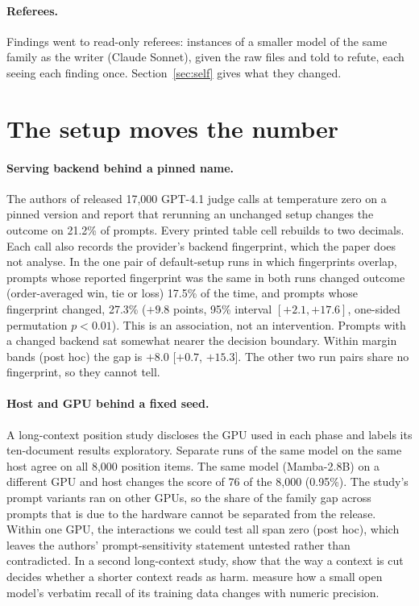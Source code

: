 \documentclass[11pt]{article}
\begin{document}
\paragraph{Referees.} Findings went to read-only referees: instances of a smaller model of the same family as the writer (Claude Sonnet),
given the raw files and told to refute, each seeing each finding once. Section~\ref{sec:self} gives what they changed.

\section{The setup moves the number}
\paragraph{Serving backend behind a pinned name.} The authors of \citep{r2610_30512} released 17,000 GPT-4.1 judge calls at temperature zero
on a pinned version and report that rerunning an unchanged setup changes the outcome on 21.2\% of prompts. Every printed table cell rebuilds to
two decimals. Each call also records the provider's backend fingerprint, which the paper does not analyse. In the one pair of default-setup
runs in which fingerprints overlap, prompts whose reported fingerprint was the same in both runs changed outcome (order-averaged win, tie or
loss) 17.5\% of the time, and prompts whose fingerprint changed, 27.3\% ($+9.8$ points, 95\% interval $[+2.1,+17.6]$, one-sided permutation
$p<0.01$). This is an association, not an intervention. Prompts with a changed backend sat somewhat nearer the decision boundary. Within margin
bands (post hoc) the gap is $+8.0$ [$+0.7$, $+15.3$]. The other two run pairs share no fingerprint, so they cannot tell.
\paragraph{Host and GPU behind a fixed seed.} A long-context position study \citep{r2610_31135} discloses the GPU used in each phase and labels
its ten-document results exploratory. Separate runs of the same model on the same host agree on all 8,000 position items. The same model (Mamba-2.8B)
on a different GPU and host changes the score of 76 of the 8,000 (0.95\%). The study's prompt variants
ran on other GPUs, so the share of the family gap across prompts that is due to the hardware cannot be separated from the release. Within one
GPU, the interactions we could test all span zero (post hoc), which leaves the authors' prompt-sensitivity statement untested rather than
contradicted. In a second long-context study, \citet{r2608_03297} show that the way a context is cut decides whether a shorter context
reads as harm. \citet{r2607_25451} measure how a small open model's verbatim recall of its training data changes with numeric precision.
\end{document}
